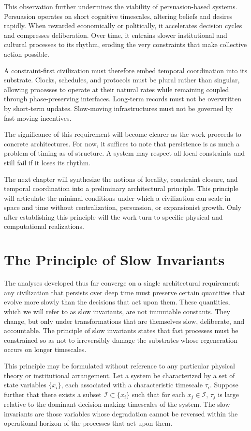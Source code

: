 \documentclass[12pt,oneside]{book}
\begin{document}
This observation further undermines the viability of persuasion-based systems. Persuasion operates on short cognitive timescales, altering beliefs and desires rapidly. When rewarded economically or politically, it accelerates decision cycles and compresses deliberation. Over time, it entrains slower institutional and cultural processes to its rhythm, eroding the very constraints that make collective action possible.

A constraint-first civilization must therefore embed temporal coordination into its substrate. Clocks, schedules, and protocols must be plural rather than singular, allowing processes to operate at their natural rates while remaining coupled through phase-preserving interfaces. Long-term records must not be overwritten by short-term updates. Slow-moving infrastructures must not be governed by fast-moving incentives.

The significance of this requirement will become clearer as the work proceeds to concrete architectures. For now, it suffices to note that persistence is as much a problem of timing as of structure. A system may respect all local constraints and still fail if it loses its rhythm.

The next chapter will synthesize the notions of locality, constraint closure, and temporal coordination into a preliminary architectural principle. This principle will articulate the minimal conditions under which a civilization can scale in space and time without centralization, persuasion, or expansionist growth. Only after establishing this principle will the work turn to specific physical and computational realizations.

\chapter{The Principle of Slow Invariants}

The analyses developed thus far converge on a single architectural requirement: any civilization that persists over deep time must preserve certain quantities that evolve more slowly than the decisions that act upon them. These quantities, which we will refer to as slow invariants, are not immutable constants. They change, but only under transformations that are themselves slow, deliberate, and accountable. The principle of slow invariants states that fast processes must be constrained so as not to irreversibly damage the substrates whose regeneration occurs on longer timescales.

This principle may be formulated without reference to any particular physical theory or institutional arrangement. Let a system be characterized by a set of state variables \(\{x_i\}\), each associated with a characteristic timescale \(\tau_i\). Suppose further that there exists a subset \(\mathcal{I} \subset \{x_i\}\) such that for each \(x_j \in \mathcal{I}\), \(\tau_j\) is large relative to the dominant decision-making timescales of the system. The slow invariants are those variables whose degradation cannot be reversed within the operational horizon of the processes that act upon them.
\end{document}
